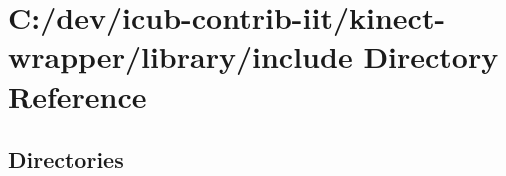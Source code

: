 \section{C\+:/dev/icub-\/contrib-\/iit/kinect-\/wrapper/library/include Directory Reference}
\label{dir_9bb0cdb2fc6936e925cffa69d90b0c80}
\subsection*{Directories}
\begin{DoxyCompactItemize}
\end{DoxyCompactItemize}

